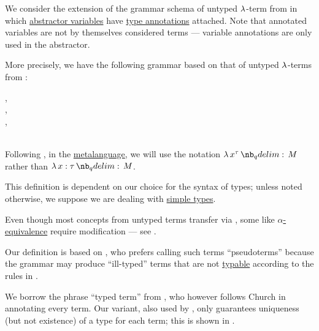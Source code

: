 \begin{definition}\label{def:typed_lambda_term}\mimprovised
  We consider the extension of the grammar schema of untyped \( \synlambda \)-term from  in which \hyperref[def:lambda_abstractor]{abstractor variables} have \hyperref[con:type_annotation]{type annotations} attached. Note that annotated variables are not by themselves considered terms --- variable annotations are only used in the abstractor.

  More precisely, we have the following grammar based on that of untyped \( \synlambda \)-terms from :
  \begin{bnf*}
     { \bnfsp \bnftsq{:} \bnfsp {}}, \\
      {\bnftsq{\( ( \)} \bnfsp {} \bnfsp {} \bnfsp \bnftsq{\( ) \)}}, \\
      {\bnftsq{\( ( \)} \bnfsp \bnftsq{\( \synlambda \)} \bnfsp {} \bnfsp {} \bnfsp {} \bnfsp \bnftsq{\( ) \)}}, \\
             { \bnfor {} \bnfor} \\
  \end{bnf*}

  Following , in the \hyperref[con:metalanguage]{metalanguage}, we will use the notation \( \qabs {x^\tau} M \) rather than \( \qabs {x: \tau} M \).
\end{definition}
\begin{comments}
  \item This definition is dependent on our choice for the syntax of types; unless noted otherwise, we suppose we are dealing with \hyperref[def:simple_type]{simple types}.

  \item Even though most concepts from untyped terms transfer via , some like \hyperref[def:lambda_term_alpha_equivalence]{\( \alpha \)-equivalence} require modification --- see .

  \item Our definition is based on , who prefers calling such terms \enquote{pseudoterms} because the grammar may produce \enquote{ill-typed} terms that are not \hyperref[def:typability]{typable} according to the rules in .

  We borrow the phrase \enquote{typed term} from , who however follows Church in annotating every term. Our variant, also used by , only guarantees uniqueness (but not existence) of a type for each term; this is shown in .
\end{comments}


